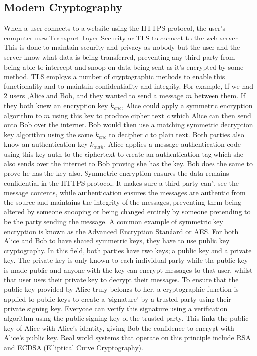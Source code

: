 \documentclass[10pt,a4paper]{IEEEtran}
\begin{document}
\subsection{Modern Cryptography}
When a user connects to a website using the HTTPS protocol, the user's computer uses Transport Layer Security or TLS to connect to the web server. This is done to maintain security and privacy as nobody but the user and the server know what data is being transferred, preventing any third party from being able to intercept and snoop on data being sent as it's encrypted by some method. TLS employs a number of cryptographic methods to enable this functionality and to maintain confidentiality and integrity.
\newline
\newline
For example, If we had 2 users ,Alice and Bob, and they wanted to send a message \(m\) between them. If they both knew an encryption key \(k_{enc}\), Alice could apply a symmetric encryption algorithm to \(m\) using this key to produce cipher text \(c\) which Alice can then send onto Bob over the internet. Bob would then use a matching symmetric decryption key algorithm using the same \(k_{enc}\) to decipher \(c\) to plain text. Both parties also know an authentication key \(k_{auth}\). Alice applies a message authentication code using this key auth to the ciphertext to create an authentication tag which she also sends over the internet to Bob proving she has the key. Bob does the same to prove he has the key also. Symmetric encryption ensures the data remains confidential in the HTTPS protocol. It makes sure a third party can't see the message contents, while authentication ensures the messages are authentic from the source and maintains the integrity of the messages, preventing them being altered by someone snooping or being changed entirely by someone pretending to be the party sending the message. A common example of symmetric key encryption is known as the Advanced Encryption Standard or AES.
\newline For both Alice and Bob to have shared symmetric keys, they have to use public key cryptography. In this field, both parties have two keys; a public key and a private key. The private key is only known to each individual party while the public key is made public and anyone with the key can encrypt messages to that user, whilst that user uses their private key to decrypt their messages.
\newline To ensure that the public key provided by Alice truly belongs to her,  a cryptographic function is applied to public keys to create a `signature' by a trusted party using their private signing key. Everyone can verify this signature using a verification algorithm using the public signing key of the trusted party. This links the public key of Alice with Alice's identity, giving Bob the confidence to encrypt with Alice's public key. Real world systems that operate on this principle include RSA and ECDSA (Elliptical Curve Cryptography).
\end{document}
